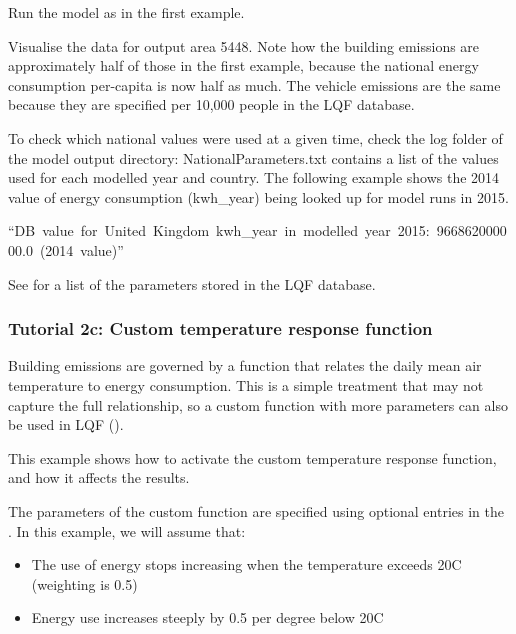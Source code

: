\documentclass[letterpaper,10pt,english]{sphinxmanual}
\let\sphinxpxdimen\pdfpxdimen\else\newdimen\sphinxpxdimen
\begin{document}
 Run the model as in the first example.

 Visualise the data for output area 5448. Note how the
building emissions are approximately half of those in the first example,
because the national energy consumption per-capita is now half as much.
The vehicle emissions are the same because they are specified per 10,000
people in the LQF database.

\begin{figure}[htbp]
\centering

\noindent\sphinxincludegraphics[width=350\sphinxpxdimen]{{525px-LQF_Tutorial_Temporal_customdatabase}.png}
\end{figure}


 To check which national values were used at a given time, check
the log folder of the model output directory: NationalParameters.txt
contains a list of the values used for each modelled year and country.
The following example shows the 2014 value of energy consumption
(kwh\_year) being looked up for model runs in 2015.

“DB value for United Kingdom kwh\_year in modelled year 2015: 966862000000.0 (2014 value)”

See  for a list of the
parameters stored in the LQF database.


\subsubsection{Tutorial 2c: Custom temperature response function}
\label{\detokenize{Tutorials/LQF:tutorial-2c-custom-temperature-response-function}}
Building emissions are governed by a function that relates the daily
mean air temperature to energy consumption. This is a simple treatment
that may not capture the full relationship, so a custom function with
more parameters can also be used in LQF ().

This example shows how to activate the custom temperature response
function, and how it affects the results.

The parameters of the custom function are specified using optional
entries in the . In this
example, we will assume that:
\begin{itemize}
\item {} 
The use of energy stops increasing when the temperature exceeds 20C
(weighting is 0.5)

\item {} 
Energy use increases steeply by 0.5 per degree below 20C

\end{itemize}
\end{document}
